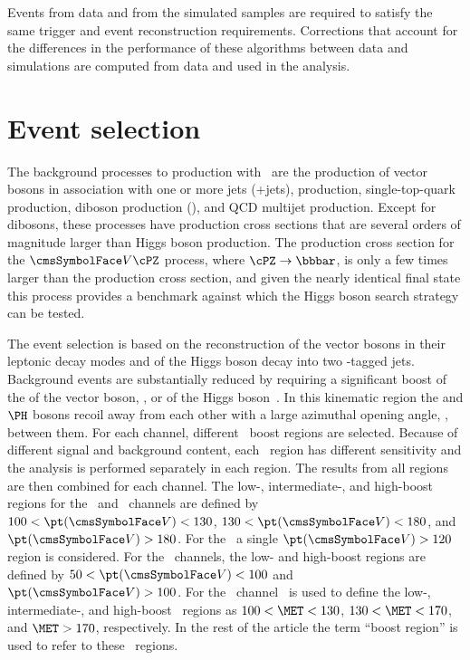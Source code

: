 \documentclass[11pt,twoside,a4paper,cmspaper,final,collab]{cms-tdr}
\begin{document}
Events from data and from the simulated samples are required to
satisfy the same trigger and event reconstruction requirements. Corrections
that account for the differences in the performance of these
algorithms between data and simulations are computed from data and used in
the analysis.


\section{Event selection}\label{sec:hbb_Event_Selection}


The background processes to \VH production with \HBB\ are the production of vector
bosons in association with one or more jets ({\Vvar}+jets), \ttbar production,
single-top-quark production, diboson production ({\Vvar}{\Vvar}),
and QCD multijet production. Except for dibosons, these processes have
production cross sections that are several orders of magnitude larger
than Higgs boson production. The production cross section for the ${\Vvar}\cPZ$ process, where
$\cPZ\to\bbbar$, is only a few times larger than the \VH
production cross section, and given the nearly identical final state this process provides a
benchmark against which the Higgs boson search strategy can be tested.



The event selection is based on the
reconstruction of the vector bosons in their leptonic decay modes and of the Higgs boson decay
into two \cPqb-tagged jets. Background events are substantially reduced by
requiring a significant boost of the \pt of the vector boson, \ptV, or
of the
Higgs boson~\cite{PhysRevLett.100.242001}.
In this kinematic region the \Vvar and $\PH$ bosons recoil away  from each other with a large azimuthal opening angle,  \dphiVH,
between them.  For each channel, different
\ptV\ boost regions are selected.
Because of different signal and background
content, each \ptV\ region has different sensitivity and
the analysis is performed separately in each region. The
results from all regions are then combined for each channel. The
{low-,} \mbox{intermediate-}, and high-boost regions
for the \WmnH\ and \WenH\ channels are defined by $100<\ptV<130$\GeV,  $130<\ptV<180$\GeV, and
$\ptV>180$\GeV.
For the \WtnH\ a single $\ptV>120$\GeV region is considered.
For the \ZllH\ channels, the low- and high-boost
regions are defined by $50<\ptV<100$\GeV
and $\ptV>100$\GeV.
For the \ZnnH\ channel \MET\ is used to define the low-, intermediate-, and high-boost
\ptV\ regions as $100<\MET<130$\GeV, $130<\MET<170$\GeV, and
$\MET>170$\GeV, respectively. In the rest of the article
the term ``boost region'' is used to refer to these \ptV\ regions.
\end{document}
